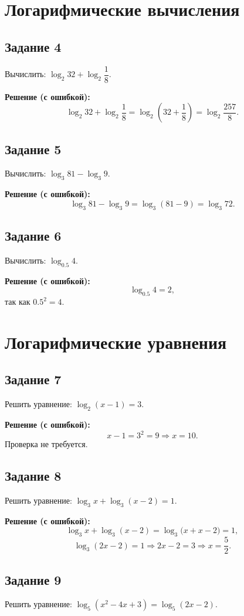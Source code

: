 \documentclass[12pt,a4paper]{article}
\begin{document}
\section{Логарифмические вычисления}

\subsection*{Задание 4}
Вычислить: $\log_2 32 + \log_2 \dfrac{1}{8}$.

\textbf{Решение (с ошибкой):}
\[
\log_2 32 + \log_2 \frac{1}{8}
= \log_2\left(32+\frac{1}{8}\right)
= \log_2\frac{257}{8}.
\]

\subsection*{Задание 5}
Вычислить: $\log_3 81 - \log_3 9$.

\textbf{Решение (с ошибкой):}
\[
\log_3 81 - \log_3 9 = \log_3(81-9)=\log_3 72.
\]

\subsection*{Задание 6}
Вычислить: $\log_{0.5}4$.

\textbf{Решение (с ошибкой):}
\[
\log_{0.5}4=2,
\]
так как $0.5^2=4$.

\section{Логарифмические уравнения}

\subsection*{Задание 7}
Решить уравнение: $\log_2(x-1)=3$.

\textbf{Решение (с ошибкой):}
\[
x-1=3^2=9 \Rightarrow x=10.
\]
Проверка не требуется.

\subsection*{Задание 8}
Решить уравнение: $\log_3 x + \log_3(x-2)=1$.

\textbf{Решение (с ошибкой):}
\[
\log_3 x + \log_3(x-2)=\log_3\bigl(x+x-2\bigr)=1,
\]
\[
\log_3(2x-2)=1 \Rightarrow 2x-2=3 \Rightarrow x=\frac{5}{2}.
\]

\subsection*{Задание 9}
Решить уравнение: $\log_5(x^2-4x+3)=\log_5(2x-2)$.
\end{document}
